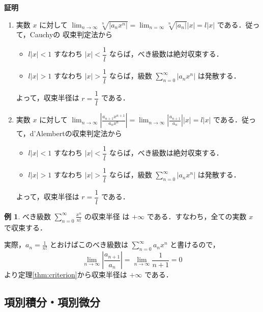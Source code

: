 \documentclass[10pt, uplatex, dvipdfmx]{jsarticle}
\makeatletter
\renewenvironment{proof}[1][\proofname]{\par
  \pushQED{\qed}%
  \normalfont \topsep6\p@\@plus6\p@\relax
  \trivlist
  \item\relax
  {\bfseries
  #1\@addpunct{.}}\hspace\labelsep\ignorespaces
}{%
  \popQED\endtrivlist\@endpefalse
}
\theoremstyle{definition}
\newtheorem{example}[theorem]{例}
\renewcommand{\proofname}{\textbf{証明}}
\numberwithin{equation}{section}
\newcommand{\ds}{\displaystyle}
\makeatother
\begin{document}
\begin{proof}
  \begin{enumerate}[(1)]
    \setlength{\itemsep}{1zh}
    
  \item 実数 $x$ に対して
    $\ds \lim_{n \to \infty} \sqrt[n]{|a_n x^n|} =
    \lim_{n=\infty}\sqrt[n]{|a_n|}|x| = l |x|$ である．従って，Cauchyの
    収束判定法から
    \begin{itemize}
      \setlength{\itemsep}{1zh}
    \item $l |x| <1$ すなわち $|x| < \dfrac{1}{l}$ ならば，べき級数は絶対収束する．
    \item $l |x| >1$ すなわち $|x| > \dfrac{1}{l}$ ならば，級数
      $\ds \sum_{n=0}^{\infty} |a_n x^n|$ は発散する．
    \end{itemize}
    よって，収束半径は $r=\dfrac{1}{l}$ である．

  \item 実数 $x$ に対して
    $\ds \lim_{n \to \infty} \left| \frac{a_{n+1}x^{n+1}}{a_n
        x^n}\right| = \lim_{n \to \infty}
    \left|\frac{a_{n+1}}{a_n}\right| |x| = l |x|$ である．従って，d'Alembertの収束判定法から
    \begin{itemize}
      \setlength{\itemsep}{1zh}
    \item $l|x| <1$ すなわち $|x| < \dfrac{1}{l}$ ならば，べき級数は絶対収束する．
    \item $l|x| >1$ すなわち $|x| > \dfrac{1}{l}$ ならば，級数 $\ds \sum_{n=0}^{\infty} |a_n x^n|$ は発散する．
    \end{itemize}
    よって，収束半径は $r= \dfrac{1}{l}$ である．
  \end{enumerate}
\end{proof}

\begin{example}
  べき級数 $\ds \sum_{n=0}^{\infty} \frac{x^n}{n!}$ の収束半径
  は $+\infty$ である．すなわち，全ての実数 $x$ で収束する．

  実際，$\ds a_n=\frac{1}{n!}$ とおけばこのべき級数は $\ds \sum_{n=0}^{\infty} a_n x^n$ と書けるので，
  \[
    \lim_{n \to \infty} \left| \frac{a_{n+1}}{a_n}\right| = \lim_{n \to \infty} \frac{1}{n+1} = 0
  \]
  より定理\ref{thm:criterion}から収束半径は $+\infty$ である．

\end{example}

\newpage

\subsection{項別積分・項別微分}
\end{document}
